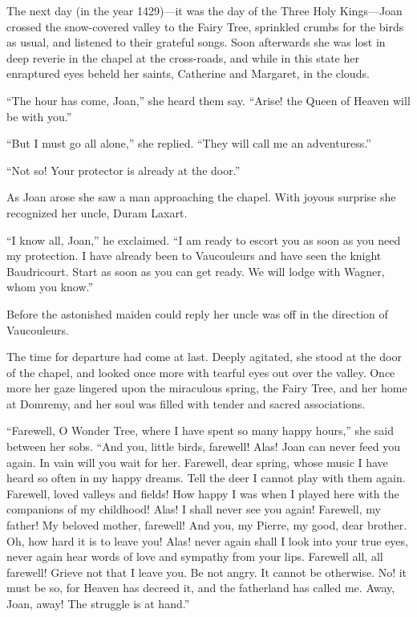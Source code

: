 The next day (in the year 1429)---it was the day of the Three Holy
Kings---Joan crossed the snow-covered valley to the Fairy Tree,
sprinkled crumbs for the birds as usual, and listened to their grateful
songs. Soon afterwards she was lost in deep reverie in the chapel at the
cross-roads, and while in this state her enraptured eyes beheld her
saints, Catherine and Margaret, in the clouds.

``The hour has come, Joan,'' she heard them say. ``Arise! the Queen of
Heaven will be with you.''

``But I must go all alone,'' she replied. ``They will call me an
adventuress.''

``Not so! Your protector is already at the door.''

As Joan arose she saw a man approaching the chapel. With joyous surprise
she recognized her uncle, Duram Laxart.

``I know all, Joan,'' he exclaimed. ``I am ready to escort you as soon
as you need my protection. I have already been to Vaucouleurs and have
seen the knight Baudricourt. Start as soon as you can get ready. We will
lodge with Wagner, whom you know.''

Before the astonished maiden could reply her uncle was off in the
direction of Vaucouleurs.

The time for departure had come at last. Deeply agitated, she stood at
the door of the chapel, and looked once more with tearful eyes out over
the valley. Once more her gaze lingered upon the miraculous spring, the
Fairy Tree, and her home at Domremy, and her soul was filled with tender
and sacred associations.

``Farewell, O Wonder Tree, where I have spent so many happy hours,'' she
said between her sobs. ``And you, little birds, farewell! Alas! Joan can
never feed you again. In vain will you wait for her. Farewell, dear
spring, whose music I have heard so often in my happy dreams. Tell the
deer I cannot play with them again. Farewell, loved valleys and fields!
How happy I was when I played here with the companions of my childhood!
Alas! I shall never see you again! Farewell, my father! My beloved
mother, farewell! And you, my Pierre, my good, dear brother. Oh, how
hard it is to leave you! Alas! never again shall I look into your true
eyes, never again hear words of love and sympathy from your lips.
Farewell all, all farewell! Grieve not that I leave you. Be not angry.
It cannot be otherwise. No! it must be so, for Heaven has decreed it,
and the fatherland has called me. Away, Joan, away! The struggle is at
hand.''

